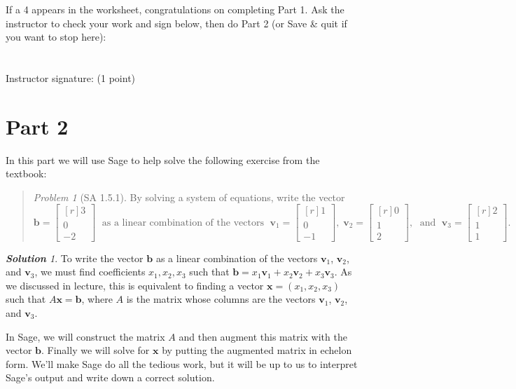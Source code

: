 \documentclass[fleqn,11pt]{paper}
\theoremstyle{remark}
\newtheorem*{prob}{Problem}
\newtheorem*{solution}{{\bf Solution}}
\renewcommand{\vec}[1]{\mathbf{#1}}
\newcommand{\<}{\ensuremath{\langle}}
\renewcommand{\>}{\ensuremath{\rangle}}
\newcommand\vb{\vec{b}}
\newcommand\vv{\vec{v}}
\newcommand\vx{\vec{x}}
\begin{document}
\begin{enumerate}
    If a 4 appears in the worksheet, congratulations on completing Part 1. Ask the
    instructor to check your work and sign below, then do Part 2 (or Save \& quit if you want to stop here):\\
    \\\\
    Instructor signature: \underline{\phantom{XXXXXXXXXXXXXXXXXXXXXXXXXXXXXXXX}} (1 point)

  \end{enumerate}

\newpage
\section*{Part 2}
In this part we will use Sage to help solve the following exercise from the textbook:
\begin{quote}
\begin{prob}[SA 1.5.1]
  By solving a system of equations, write the vector
  \[
  \vb = \begin{bmatrix*}[r] 3 \\ 0 \\ -2 \end{bmatrix*}
  \; \text{ as a linear combination of the vectors } \;
  \vv_1 = \begin{bmatrix*}[r] 1 \\ 0 \\ -1 \end{bmatrix*},
  \;
  \vv_2 = \begin{bmatrix*}[r] 0 \\ 1 \\ 2 \end{bmatrix*},
  \; \text{ and } \;
  \vv_3 = \begin{bmatrix*}[r] 2 \\ 1 \\ 1 \end{bmatrix*}.
  \]
\end{prob}
\end{quote}

\vskip1cm
\begin{solution}
  To write the vector $\vb$ as a linear combination of the vectors
  $\vv_1$, $\vv_2$,  and $\vv_3$, we must find coefficients 
  $x_1, x_2, x_3$ such that $\vb = x_1 \vv_1 +  x_2 \vv_2 + x_3 \vv_3$.  
  As we discussed in lecture, this is equivalent to
  finding a vector $\vx = (x_1, x_2, x_3)$ such that $A\vx = \vb$, where $A$ is
  the matrix whose columns are the vectors $\vv_1$, $\vv_2$, and $\vv_3$.  

  In Sage, we will construct the matrix $A$ and then augment this matrix with the 
  vector $\vb$. Finally we will solve for $\vx$ by putting the augmented matrix 
  in echelon form. We'll make Sage do all the tedious work, but it will be 
  up to us to interpret Sage's output and write down a correct solution.
  
\end{solution}
  
\end{document}
